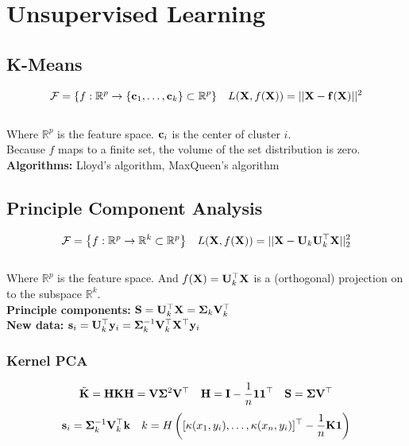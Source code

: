 \section{Unsupervised Learning}
\begin{mdframed}[style=eqbox]
\subsection{K-Means}
\vspace*{-6pt}\begin{align*}
  \mathcal F = \left\{f: \mathbb R^p \to \{\mathbf{c}_1, \ldots, \mathbf{c}_k\} \subset \mathbb R^p \right\} && L(\mathbf{X}, f(\mathbf{X})) = \vert\vert \mathbf{X} - \mathbf{f}(\mathbf{X}) \vert\vert^2
\end{align*}\vspace*{-12pt}\\
\small{Where $\mathbb R^p$ is the feature space. $\mathbf{c}_i$ is the center of cluster $i$.}\\
Because $f$ maps to a finite set, the volume of the set distribution is zero.\\
\textbf{Algorithms:} Lloyd's algorithm, MaxQueen's algorithm
\end{mdframed}
%
\begin{mdframed}[style=eqbox]
\subsection{Principle Component Analysis}
\vspace*{-6pt}\begin{align*}
  \mathcal F = \left\{f: \mathbb R^p \to \mathbb R^k \subset \mathbb R^p \right\} && L(\mathbf{X}, f(\mathbf{X})) = \vert\vert \mathbf{X} - \mathbf{U}_k \mathbf{U}_k^\top\mathbf{X} \vert\vert_2^2
\end{align*}\vspace*{-12pt}\\
\small{Where $\mathbb R^p$ is the feature space. And $f(\mathbf{X}) =\mathbf{U}_k^\top \mathbf{X}$ is a (orthogonal) projection on to the subspace $\mathbb R^k$.}\\
\textbf{Principle components:} $\mathbf{S} = \mathbf{U}_k^\top \mathbf{X} = \mathbf{\Sigma}_k \mathbf{V}_k^\top$\\
\textbf{New data:} $\mathbf{s}_i = \mathbf{U}_k^\top \mathbf{y}_i = \mathbf{\Sigma}_k^{-1} \mathbf{V}_k^\top \mathbf{X}^\top \mathbf{y}_i$
\subsubsection{Kernel PCA}
\vspace*{-8pt}\begin{align*}
  \tilde{\mathbf{K}} = \mathbf{H} \mathbf{K} \mathbf{H} = \mathbf{V} \mathbf{\Sigma}^2 \mathbf{V}^\top && \mathbf{H} = \mathbf{I} - \frac{1}{n} \mathbf{1}\mathbf{1}^\top && \mathbf{S} = \mathbf{\Sigma} \mathbf{V}^\top
\end{align*}
\vspace*{-16pt}\begin{align*}
\mathbf{s}_i = \mathbf{\Sigma}_k^{ - 1} \mathbf{V}_k^\top \mathbf{k}
  &&k = H \left([\kappa(x_1, y_i), \dots, \kappa(x_n, y_i)]^\top - \frac{1}{n}\mathbf{K} \mathbf{1}\right)
\end{align*}
\end{mdframed}